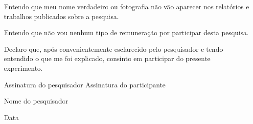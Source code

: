 Entendo que meu nome verdadeiro ou fotografia não vão aparecer nos relatórios e trabalhos publicados sobre a pesquisa.

Entendo que não vou nenhum tipo de remuneração por participar desta pesquisa.

Declaro que, após convenientemente esclarecido pelo pesquisador e tendo entendido o que me foi explicado, consinto em participar do presente experimento.

\vspace{1in}

Assinatura do pesquisador \hspace{4cm}  Assinatura do participante

\vspace{1in}

	 
Nome do pesquisador

\vspace{1in}

Data

